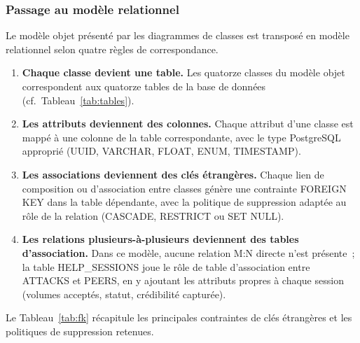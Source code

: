 \subsubsection{Passage au modèle relationnel}

Le modèle objet présenté par les diagrammes de classes est transposé en modèle relationnel selon quatre règles de correspondance.

\begin{enumerate}
    \item \textbf{Chaque classe devient une table.} Les quatorze classes du modèle objet correspondent aux quatorze tables de la base de données (cf.\ Tableau~\ref{tab:tables}).
    \item \textbf{Les attributs deviennent des colonnes.} Chaque attribut d'une classe est mappé à une colonne de la table correspondante, avec le type PostgreSQL approprié ({UUID}, {VARCHAR}, {FLOAT}, {ENUM}, {TIMESTAMP}).
    \item \textbf{Les associations deviennent des clés étrangères.} Chaque lien de composition ou d'association entre classes génère une contrainte {FOREIGN KEY} dans la table dépendante, avec la politique de suppression adaptée au rôle de la relation (CASCADE, RESTRICT ou SET NULL).
    \item \textbf{Les relations plusieurs-à-plusieurs deviennent des tables d'association.} Dans ce modèle, aucune relation M:N directe n'est présente~; la table {HELP\_SESSIONS} joue le rôle de table d'association entre {ATTACKS} et {PEERS}, en y ajoutant les attributs propres à chaque session (volumes acceptés, statut, crédibilité capturée).
\end{enumerate}

Le Tableau~\ref{tab:fk} récapitule les principales contraintes de clés étrangères et les politiques de suppression retenues.

